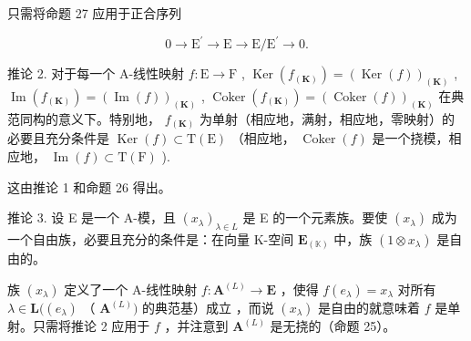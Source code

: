 只需将命题 27 应用于正合序列

\[
0 \rightarrow \mathrm{E} ^ {\prime} \rightarrow \mathrm{E} \rightarrow \mathrm{E} / \mathrm{E} ^ {\prime} \rightarrow 0.
\]

推论 2. 对于每一个 A-线性映射 \(f: \mathrm{E} \to \mathrm{F}\) , \(\operatorname{Ker}(f_{(\mathbf{K})}) = (\operatorname{Ker}(f))_{(\mathbf{K})}\) , \(\operatorname{Im}(f_{(\mathbf{K})}) = (\operatorname{Im}(f))_{(\mathbf{K})}\) , \(\operatorname{Coker}(f_{(\mathbf{K})}) = (\operatorname{Coker}(f))_{(\mathbf{K})}\) 在典范同构的意义下。特别地， \(f_{(\mathbf{K})}\) 为单射（相应地，满射，相应地，零映射）的必要且充分条件是 \(\operatorname{Ker}(f) \subset \mathrm{T}(\mathrm{E})\) （相应地， \(\operatorname{Coker}(f)\) 是一个挠模，相应地， \(\operatorname{Im}(f) \subset \mathrm{T}(\mathrm{F})\) ).

这由推论 1 和命题 26 得出。

推论 3. 设 E 是一个 A-模，且 \((x_{\lambda})_{\lambda \in L}\) 是 E 的一个元素族。要使 \((x_{\lambda})\) 成为一个自由族，必要且充分的条件是：在向量 K-空间 \(\mathbf{E}_{(\mathbb{K})}\) 中，族 \((1 \otimes x_{\lambda})\) 是自由的。

族 \((x_{\lambda})\) 定义了一个 A-线性映射 \(f: \mathbf{A}^{(L)} \to \mathbf{E}\) ，使得 \(f(e_{\lambda}) = x_{\lambda}\) 对所有 \(\lambda \in \mathbf{L}((e_{\lambda})\) （ \(\mathbf{A}^{(L)})\) 的典范基）成立 ，而说 \((x_{\lambda})\) 是自由的就意味着 \(f\) 是单射。只需将推论 2 应用于 \(f\) ，并注意到 \(\mathbf{A}^{(L)}\) 是无挠的（命题 25）。

